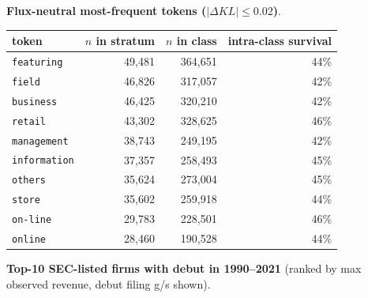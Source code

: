 \textbf{Flux-neutral most-frequent tokens ($|\Delta KL|\leq 0.02$)}.

\begin{tabular}{lrrr}
\toprule
token & $n$ in stratum & $n$ in class & intra-class survival \\
\midrule
\texttt{featuring} & 49,481 & 364,651 & 44\% \\
\texttt{field} & 46,826 & 317,057 & 42\% \\
\texttt{business} & 46,425 & 320,210 & 42\% \\
\texttt{retail} & 43,302 & 328,625 & 46\% \\
\texttt{management} & 38,743 & 249,195 & 42\% \\
\texttt{information} & 37,357 & 258,493 & 45\% \\
\texttt{others} & 35,624 & 273,004 & 45\% \\
\texttt{store} & 35,602 & 259,918 & 44\% \\
\texttt{on-line} & 29,783 & 228,501 & 46\% \\
\texttt{online} & 28,460 & 190,528 & 44\% \\
\bottomrule
\end{tabular}

\textbf{Top-10 SEC-listed firms with debut in 1990--2021} (ranked by max observed revenue, debut filing g/s shown).

